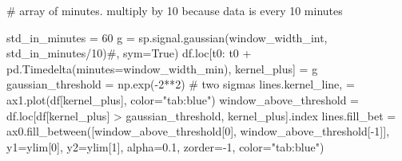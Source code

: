 \documentclass[
  letterpaper,
  DIV=11,
  numbers=noendperiod,
  oneside]{scrreprt}
\newenvironment{Shaded}{\begin{snugshade}}{\end{snugshade}}
\newcommand{\CommentTok}[1]{\textcolor[rgb]{0.37,0.37,0.37}{#1}}
\newcommand{\DecValTok}[1]{\textcolor[rgb]{0.68,0.00,0.00}{#1}}
\newcommand{\FloatTok}[1]{\textcolor[rgb]{0.68,0.00,0.00}{#1}}
\newcommand{\NormalTok}[1]{\textcolor[rgb]{0.00,0.23,0.31}{#1}}
\newcommand{\OperatorTok}[1]{\textcolor[rgb]{0.37,0.37,0.37}{#1}}
\newcommand{\StringTok}[1]{\textcolor[rgb]{0.13,0.47,0.30}{#1}}
\begin{document}
\begin{Shaded}
\begin{Highlighting}[]
\CommentTok{\# array of minutes. multiply by 10 because data is every 10 minutes}

\NormalTok{std\_in\_minutes }\OperatorTok{=} \DecValTok{60}
\NormalTok{g }\OperatorTok{=}\NormalTok{ sp.signal.gaussian(window\_width\_int, std\_in\_minutes}\OperatorTok{/}\DecValTok{10}\NormalTok{)}\CommentTok{\#, sym=True)}
\NormalTok{df.loc[t0: t0 }\OperatorTok{+}\NormalTok{ pd.Timedelta(minutes}\OperatorTok{=}\NormalTok{window\_width\_min), }\StringTok{\textquotesingle{}kernel\_plus\textquotesingle{}}\NormalTok{] }\OperatorTok{=}\NormalTok{ g}
\NormalTok{gaussian\_threshold }\OperatorTok{=}\NormalTok{ np.exp(}\OperatorTok{{-}}\DecValTok{2}\OperatorTok{**}\DecValTok{2}\NormalTok{)  }\CommentTok{\# two sigmas}
\NormalTok{lines.kernel\_line, }\OperatorTok{=}\NormalTok{ ax1.plot(df[}\StringTok{\textquotesingle{}kernel\_plus\textquotesingle{}}\NormalTok{], color}\OperatorTok{=}\StringTok{"tab:blue"}\NormalTok{)}
\NormalTok{window\_above\_threshold }\OperatorTok{=}\NormalTok{ df.loc[df[}\StringTok{\textquotesingle{}kernel\_plus\textquotesingle{}}\NormalTok{] }\OperatorTok{\textgreater{}}\NormalTok{ gaussian\_threshold, }\StringTok{\textquotesingle{}kernel\_plus\textquotesingle{}}\NormalTok{].index}
\NormalTok{lines.fill\_bet }\OperatorTok{=}\NormalTok{ ax0.fill\_between([window\_above\_threshold[}\DecValTok{0}\NormalTok{], window\_above\_threshold[}\OperatorTok{{-}}\DecValTok{1}\NormalTok{]],}
\NormalTok{                                           y1}\OperatorTok{=}\NormalTok{ylim[}\DecValTok{0}\NormalTok{], y2}\OperatorTok{=}\NormalTok{ylim[}\DecValTok{1}\NormalTok{], alpha}\OperatorTok{=}\FloatTok{0.1}\NormalTok{, zorder}\OperatorTok{={-}}\DecValTok{1}\NormalTok{, color}\OperatorTok{=}\StringTok{"tab:blue"}\NormalTok{)}


\end{Highlighting}
\end{Shaded}
\end{document}
